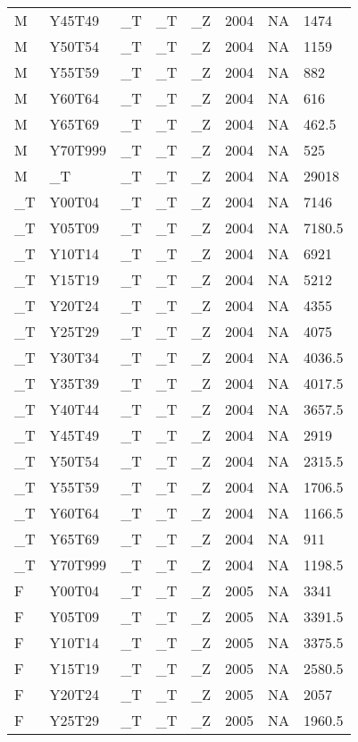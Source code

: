 \begin{longtable}[t]{llllllll}
M & Y45T49 & \_T & \_T & \_Z & 2004 & NA & 1474\\
M & Y50T54 & \_T & \_T & \_Z & 2004 & NA & 1159\\
M & Y55T59 & \_T & \_T & \_Z & 2004 & NA & 882\\
M & Y60T64 & \_T & \_T & \_Z & 2004 & NA & 616\\
\addlinespace
M & Y65T69 & \_T & \_T & \_Z & 2004 & NA & 462.5\\
M & Y70T999 & \_T & \_T & \_Z & 2004 & NA & 525\\
M & \_T & \_T & \_T & \_Z & 2004 & NA & 29018\\
\_T & Y00T04 & \_T & \_T & \_Z & 2004 & NA & 7146\\
\_T & Y05T09 & \_T & \_T & \_Z & 2004 & NA & 7180.5\\
\addlinespace
\_T & Y10T14 & \_T & \_T & \_Z & 2004 & NA & 6921\\
\_T & Y15T19 & \_T & \_T & \_Z & 2004 & NA & 5212\\
\_T & Y20T24 & \_T & \_T & \_Z & 2004 & NA & 4355\\
\_T & Y25T29 & \_T & \_T & \_Z & 2004 & NA & 4075\\
\_T & Y30T34 & \_T & \_T & \_Z & 2004 & NA & 4036.5\\
\addlinespace
\_T & Y35T39 & \_T & \_T & \_Z & 2004 & NA & 4017.5\\
\_T & Y40T44 & \_T & \_T & \_Z & 2004 & NA & 3657.5\\
\_T & Y45T49 & \_T & \_T & \_Z & 2004 & NA & 2919\\
\_T & Y50T54 & \_T & \_T & \_Z & 2004 & NA & 2315.5\\
\_T & Y55T59 & \_T & \_T & \_Z & 2004 & NA & 1706.5\\
\addlinespace
\_T & Y60T64 & \_T & \_T & \_Z & 2004 & NA & 1166.5\\
\_T & Y65T69 & \_T & \_T & \_Z & 2004 & NA & 911\\
\_T & Y70T999 & \_T & \_T & \_Z & 2004 & NA & 1198.5\\
F & Y00T04 & \_T & \_T & \_Z & 2005 & NA & 3341\\
F & Y05T09 & \_T & \_T & \_Z & 2005 & NA & 3391.5\\
\addlinespace
F & Y10T14 & \_T & \_T & \_Z & 2005 & NA & 3375.5\\
F & Y15T19 & \_T & \_T & \_Z & 2005 & NA & 2580.5\\
F & Y20T24 & \_T & \_T & \_Z & 2005 & NA & 2057\\
F & Y25T29 & \_T & \_T & \_Z & 2005 & NA & 1960.5\\

\end{longtable}
